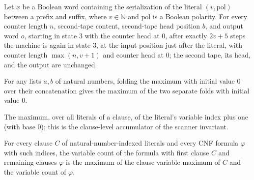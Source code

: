 \begin{lemma}
\label{Complexity.satRed_maxLiteral}
\leanok
{}
Let $x$ be a Boolean word containing the serialization of the literal $(v,\mathrm{pol})$
between a prefix and suffix, where $v\in\mathbb{N}$ and $\mathrm{pol}$ is a Boolean
polarity. For every counter length $n$, second-tape content, second-tape head position
$b$, and output word $o$, starting in state $3$ with the counter head at $0$, after
exactly $2v+5$ steps the machine is again in state $3$, at the input position just after
the literal, with counter length $\max(n,v+1)$ and counter head at $0$; the second tape,
its head, and the output are unchanged.
\end{lemma}

\begin{lemma}
\label{Complexity.sat_foldMax_append}
\leanok
{}
For any lists $a,b$ of natural numbers, folding the maximum with initial value $0$ over
their concatenation gives the maximum of the two separate folds with initial value $0$.
\end{lemma}

\begin{definition}
\label{Complexity.satClauseVars}
\leanok
The maximum, over all literals of a clause, of the literal's variable index plus
one (with base $0$); this is the clause-level accumulator of the scanner
invariant.
\end{definition}

\begin{lemma}
\label{Complexity.sat_numVars_cons}
\leanok
{}
For every clause $C$ of natural-number-indexed literals and every CNF formula $\varphi$
with such indices, the variable count of the formula with first clause $C$ and remaining
clauses $\varphi$ is the maximum of the clause variable maximum of $C$ and the variable
count of $\varphi$.
\end{lemma}

